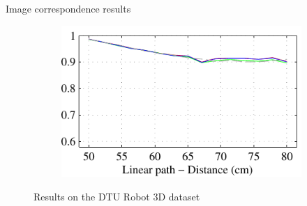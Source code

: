 \documentclass[14pt,t]{beamer}
\begin{document}
\begin{frame}{Image correspondence results}
\begin{figure}
\begin{subfigure}[t]{0.49\textwidth}
	\end{subfigure}
	\begin{subfigure}[t]{0.44\textwidth}
		\includegraphics[width=\textwidth]{img/dtuResultsPR_opponent_4.pdf}
	\end{subfigure}
	\caption{Results on the DTU Robot 3D dataset}
\end{figure}
\end{frame}
%
\end{document}
